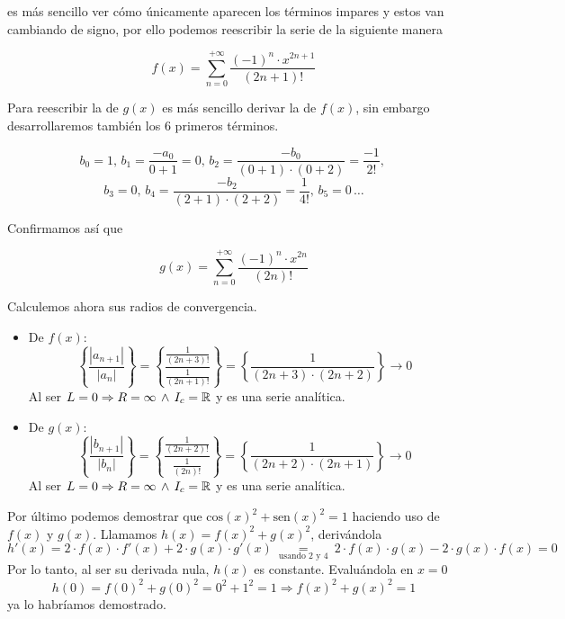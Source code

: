 \documentclass[12pt]{article}
\begin{document}
\begin{ejercicio}[2 puntos]
		es más sencillo ver cómo únicamente aparecen los términos impares y estos van cambiando de signo, por ello podemos reescribir la serie de la siguiente manera
		
		$$ f(x) = \sum_{n=0}^{+\infty} \frac{(-1)^n \cdot x^{2n+1}}{(2n+1)!} $$
		
		Para reescribir la de $g(x)$ es más sencillo derivar la de $f(x)$, sin embargo desarrollaremos también los 6 primeros términos.
		
		$$b_0=1, \, b_1=\frac{-a_0}{0+1}=0,\, b_2=\frac{-b_0}{(0+1)\cdot (0+2)}= \frac{-1}{2!}, \, $$
		$$b_3 = 0, \, b_4=\frac{-b_2}{(2+1)\cdot (2+2)}= \frac{1}{4!}, \, b_5=0 \, \ldots$$
		
		Confirmamos así que 
		
		$$g(x)= \sum_{n=0}^{+\infty} \frac{(-1)^n \cdot x^{2n}}{(2n)!}$$
		
		Calculemos ahora sus radios de convergencia.
		
		\begin{itemize}
			\item De $f(x)$:
			$$ \left\{\frac{|a_{n+1}|}{|a_n|}\right\} = \left\{\frac{\frac{1}{(2n+3)!}}{\frac{1}{(2n+1)!}}\right\}=\left\{\frac{1}{(2n+3)\cdot(2n+2)}\right\} \longrightarrow 0 $$
			Al ser $L=0 \Rightarrow R=\infty \, \wedge \, I_c=\mathbb{R}$ y es una serie analítica.
			
			\item De $g(x)$:
			$$ \left\{\frac{|b_{n+1}|}{|b_n|}\right\} = \left\{\frac{\frac{1}{(2n+2)!}}{\frac{1}{(2n)!}}\right\}=\left\{\frac{1}{(2n+2)\cdot(2n+1)}\right\} \longrightarrow 0 $$
			Al ser $L=0 \Rightarrow R=\infty \, \wedge \, I_c=\mathbb{R}$ y es una serie analítica.
		\end{itemize}
		
		Por último podemos demostrar que $\text{cos}(x)^2+\text{sen}(x)^2=1$ haciendo uso de $f(x)$ y $g(x)$. Llamamos $h(x)=f(x)^2+g(x)^2$, derivándola
		$$h'(x)=2 \cdot f(x) \cdot f'(x) + 2 \cdot g(x) \cdot g'(x) \underset{ \text{ usando 2 y 4 }}{=} 2 \cdot f(x) \cdot g(x) - 2 \cdot g(x) \cdot f(x)=0$$
		Por lo tanto, al ser su derivada nula, $h(x)$ es constante. Evaluándola en $x=0$
		$$h(0)= f(0)^2+g(0)^2 = 0^2+1^2=1 \Rightarrow f(x)^2+g(x)^2 = 1$$
		ya lo habríamos demostrado.
		
	\end{ejercicio}
	
\end{document}
